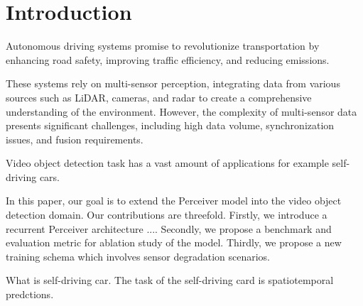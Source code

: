\section{Introduction} \label{Introduction}



Autonomous driving systems promise to revolutionize transportation by enhancing road safety, improving traffic efficiency, and reducing emissions.


These systems rely on multi-sensor perception, integrating data from various sources such as LiDAR, cameras, and radar to create a comprehensive understanding of the environment. However, the complexity of multi-sensor data presents significant challenges, including high data volume, synchronization issues, and fusion requirements.

Video object detection task has a vast amount of applications for example self-driving cars.


In this paper, our goal is to extend the Perceiver model into the video object detection domain. Our contributions are threefold.
Firstly, we introduce a recurrent Perceiver architecture ....
Secondly, we propose a benchmark and evaluation metric for ablation study of the model.
Thirdly, we propose a new training schema which involves sensor degradation scenarios.

What is self-driving car. The task of the self-driving card is spatiotemporal predctions.


